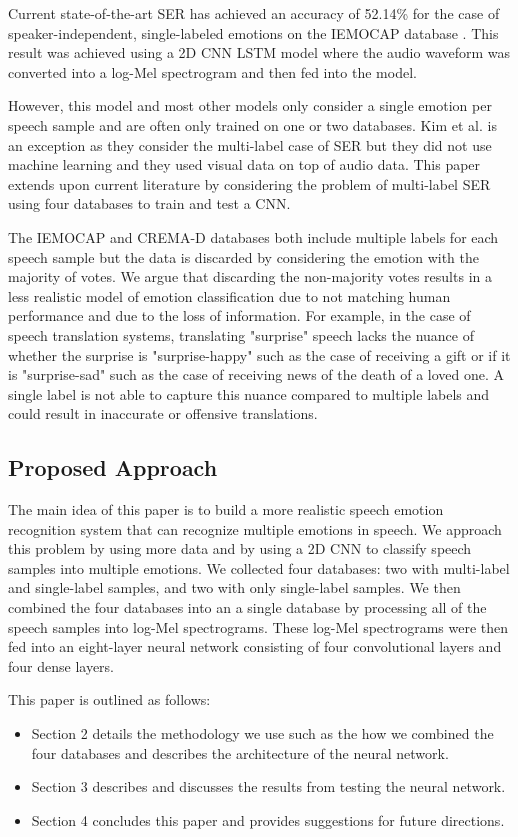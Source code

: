 Current state-of-the-art SER has achieved an accuracy of 52.14\% for the case of speaker-independent, single-labeled emotions on the IEMOCAP database \cite{Zhao2019}. This result was achieved using a 2D CNN LSTM model where the audio waveform was converted into a log-Mel spectrogram and then fed into the model.

However, this model and most other models only consider a single emotion per speech sample and are often only trained on one or two databases. Kim et al. \cite{Kim2018a} is an exception as they consider the multi-label case of SER but they did not use machine learning and they used visual data on top of audio data. This paper extends upon current literature by considering the problem of multi-label SER using four databases to train and test a CNN.

The IEMOCAP \cite{busso_2008} and CREMA-D \cite{cao_2014} databases both include multiple labels for each speech sample but the data is discarded by considering the emotion with the majority of votes. We argue that discarding the non-majority votes results in a less realistic model of emotion classification due to not matching human performance and due to the loss of information. For example, in the case of speech translation systems, translating "surprise" speech lacks the nuance of whether the surprise is "surprise-happy" such as the case of receiving a gift or if it is "surprise-sad" such as the case of receiving news of the death of a loved one. A single label is not able to capture this nuance compared to multiple labels and could result in inaccurate or offensive translations.

\subsection{Proposed Approach}

The main idea of this paper is to build a more realistic speech emotion recognition system that can recognize multiple emotions in speech. We approach this problem by using more data and by using a 2D CNN to classify speech samples into multiple emotions. We collected four databases: two with multi-label and single-label samples, and two with only single-label samples. We then combined the four databases into an a single database by processing all of the speech samples into log-Mel spectrograms. These log-Mel spectrograms were then fed into an eight-layer neural network consisting of four convolutional layers and four dense layers.

This paper is outlined as follows:
\begin{itemize}
	\item Section 2 details the methodology we use such as the how we combined the four databases and describes the architecture of the neural network.
	\item Section 3 describes and discusses the results from testing the neural network.
	\item Section 4 concludes this paper and provides suggestions for future directions.
\end{itemize}

